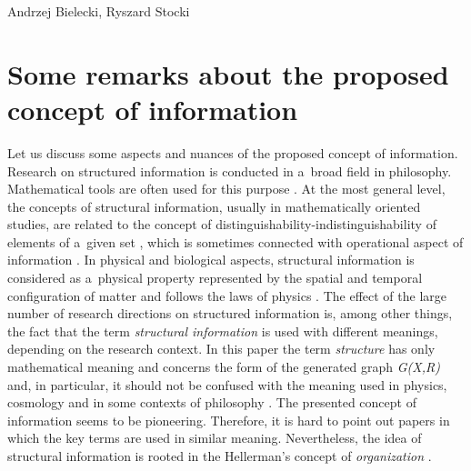 \begin{artengenv2auth}{Andrzej Bielecki, Ryszard Stocki}
\section{Some remarks about the proposed concept of information}

Let us discuss some aspects and nuances of the proposed concept of information. Research on structured information is conducted in a~broad field in philosophy. Mathematical tools are often used for this purpose 
\parencite[][]{schroeder_analogy_2019}. %
 At the most general level, the concepts of structural information, usually in mathematically oriented studies, are related to the concept of distinguishability-indistinguishability of elements of a~given set 
\parencite[][]{dodig-crnkovic_theoretical_2019}, %
 which is sometimes connected with operational aspect of information 
\parencite[][]{bateson_information_1951}. %
 In physical and biological aspects, structural information is considered as a~physical property represented by the spatial and temporal configuration of matter and follows the laws of physics 
\parencites[][]{ebeling_selforganization_2015}[][]{davies_demon_2019}. %
 The effect of the large number of research directions on structured information is, among other things, the fact that the term \textit{structural information} is used with different meanings, depending on the research context. In this paper the term \textit{structure} has only mathematical meaning and concerns the form of the generated graph \textit{G(X,R)} and, in particular, it should not be confused with the meaning used in physics, cosmology and in some contexts of philosophy 
\parencite[see, e.g.,][]{burgin_information_2011}. %
 The presented concept of information seems to be pioneering. Therefore, it is hard to point out papers in which the key terms are used in similar meaning. Nevertheless, the idea of structural information is rooted in the Hellerman's concept of \textit{organization}  
\parencites[see][]{hellerman_representation_2006}[][]{hellerman_animate_2016}.%





\end{artengenv2auth}

